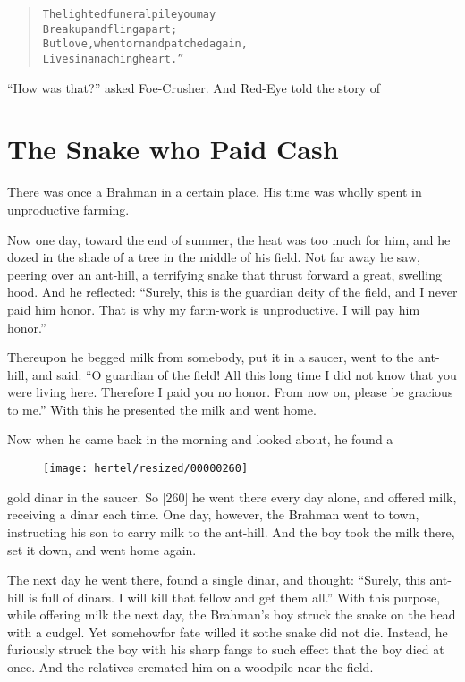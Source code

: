 \documentclass[article, twoside, 10pt]{memoir}
\renewenvironment{verbatim}{%
\begin{quote}%
\vskip -10pt%
\begin{alltt}\normalfont\small}{\end{alltt}%
\end{quote}%
\vskip -10pt
} %
\begin{document}
\begin{verbatim}
The lighted funeral pile you may
    Break up and fling apart;
But love, when torn and patched again,
    Lives in an aching heart.”
\end{verbatim}
``How was that?'' asked Foe-Crusher. And Red-Eye told the story of

\chapter{The Snake who Paid Cash}

There was once a Brahman in a certain place. His time was wholly
spent in unproductive farming.

Now one day, toward the end of summer, the heat was too much for
him, and he dozed in the shade of a tree in the middle of his
field. Not far away he saw, peering over an ant-hill, a terrifying
snake that thrust forward a great, swelling hood. And he reflected:
``Surely, this is the guardian deity of the field, and I never paid him honor. That is why my farm-work is unproductive. I will pay him honor.''

Thereupon he begged milk from somebody, put it in a saucer, went to
the ant-hill, and said:
``O guardian of the field! All this long time I did not know that you were living here. Therefore I paid you no honor. From now on, please be gracious to me.''
With this he presented the milk and went home.

Now when he came back in the morning and looked about, he found a
\begin{figure}[p]\texttt{[image: hertel/resized/00000260]}\end{figure}gold dinar in the saucer. So [260] he went there every day alone,
and offered milk, receiving a dinar each time. One day, however,
the Brahman went to town, instructing his son to carry milk to the
ant-hill. And the boy took the milk there, set it down, and went
home again.

The next day he went there, found a single dinar, and thought:
``Surely, this ant-hill is full of dinars. I will kill that fellow and get them all.''
With this purpose, while offering milk the next day, the Brahman's
boy struck the snake on the head with a cudgel. Yet somehow{\textemdash}for
fate willed it so{\textemdash}the snake did not die. Instead, he furiously
struck the boy with his sharp fangs to such effect that the boy
died at once. And the relatives cremated him on a woodpile near the
field.
\end{document}

